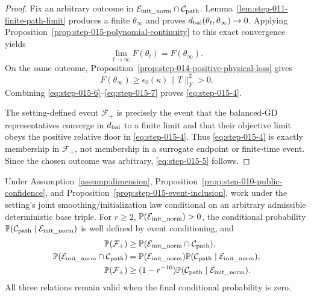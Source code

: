 \begin{proof}
Fix an arbitrary outcome in
\(\mathcal E_{\rm init\_norm}\cap\mathcal C_{\rm path}\). Lemma~\ref{lem:step-011-finite-path-limit} produces a finite
\(\theta_\infty\) and proves
\(d_{\rm bal}(\theta_t,\theta_\infty)\to0\). Applying
Proposition~\ref{prop:step-015-polynomial-continuity} to this exact
convergence yields
\begin{equation}
  \lim_{t\to\infty}F(\theta_t)=F(\theta_\infty).        \label{eq:step-015-6}
\end{equation}
On the same outcome, Proposition~\ref{prop:step-014-positive-physical-loss} gives
\begin{equation}
  F(\theta_\infty)
  \ge\epsilon_0(\kappa)\|T\|_F^2>0.                    \label{eq:step-015-7}
\end{equation}
Combining \eqref{eq:step-015-6}--\eqref{eq:step-015-7} proves \eqref{eq:step-015-4}.

The setting-defined event \(\mathcal F_+\) is precisely the event that the
balanced-GD representatives converge in \(d_{\rm bal}\) to a finite limit
and that their objective limit obeys the positive relative floor in \eqref{eq:step-015-4}.
Thus \eqref{eq:step-015-4} is exactly membership in \(\mathcal F_+\), not membership in a
surrogate endpoint or finite-time event. Since the chosen outcome was
arbitrary, \eqref{eq:step-015-5} follows. 

\end{proof}


\begin{proposition}
\label{prop:step-015-conditional-accounting}
Under Assumption~\ref{assump:dimension}, Proposition~\ref{prop:step-010-public-confidence}, and
Proposition~\ref{prop:step-015-event-inclusion}, work under the setting's
joint smoothing/initialization law conditional on an arbitrary admissible
deterministic base triple. For \(r\ge2\),
\(\mathbb P(\mathcal E_{\rm init\_norm})>0\), the conditional probability
\(\mathbb P(\mathcal C_{\rm path}\mid
\mathcal E_{\rm init\_norm})\) is well defined by event conditioning, and
\[
\begin{aligned}
  \mathbb P(\mathcal F_+)
  &\ge \mathbb P(\mathcal E_{\rm init\_norm}
    \cap\mathcal C_{\rm path}),\\
  \mathbb P(\mathcal E_{\rm init\_norm}
    \cap\mathcal C_{\rm path})
  &=\mathbb P(\mathcal E_{\rm init\_norm})
    \mathbb P(\mathcal C_{\rm path}
      \mid\mathcal E_{\rm init\_norm}),\\
  \mathbb P(\mathcal F_+)
  &\ge(1-r^{-10})
    \mathbb P(\mathcal C_{\rm path}
      \mid\mathcal E_{\rm init\_norm}).
\end{aligned}
\]
All three relations remain valid when the final conditional probability is
zero.

\end{proposition}


